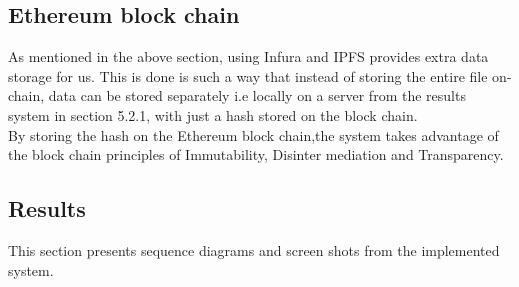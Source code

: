 \subsection{Ethereum block chain}
As mentioned in the above section, using Infura and IPFS provides extra data storage for us. This is done is such a way that instead of storing the entire file on-chain, data can be stored separately i.e locally on a server from the results system in section 5.2.1, with just a hash stored on the block chain.\\By storing the hash on the Ethereum block chain,the system takes advantage of the block chain principles of Immutability, Disinter mediation and Transparency.

\subsection{Results}
This section presents sequence diagrams and screen shots from the implemented system.
